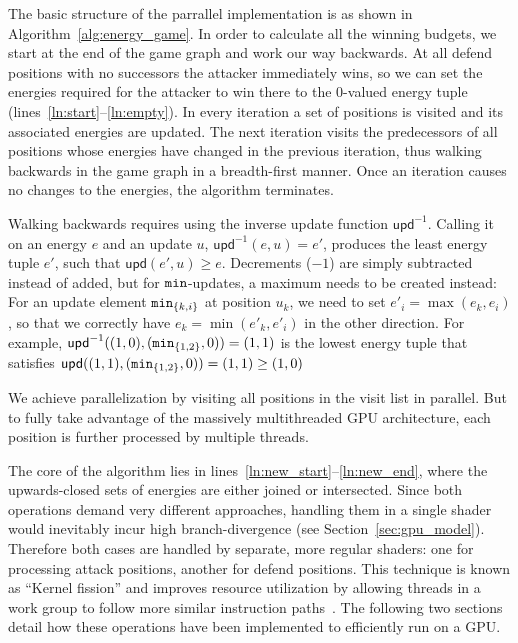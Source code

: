 The basic structure of the parrallel implementation
is as shown in Algorithm~\ref{alg:energy_game}.
In order to calculate all the winning budgets,
we start at the end of the game graph and work our way backwards.
At all defend positions with no successors the attacker immediately wins,
so we can set the energies required for the attacker to win there to the
0-valued energy tuple (lines~\ref{ln:start}--\ref{ln:empty}).
In every iteration a set of positions is visited
and its associated energies are updated.
The next iteration visits the predecessors of all positions whose energies
have changed in the previous iteration,
thus walking backwards in the game graph in a breadth-first manner.
Once an iteration causes no changes to the energies, the algorithm terminates.

Walking backwards requires using the inverse update function
$\mathsf{upd}^{-1}$.
Calling it on an energy $e$ and an update $u$, $\mathsf{upd}^{-1}(e, u) = e'$,
produces the least energy tuple $e'$, such that $\mathsf{upd}(e', u) \geq e$.
Decrements ($-1$) are simply subtracted instead of added,
but for $\mathtt{min}$-updates, a maximum needs to be created instead:
For an update element $\mathtt{min}_{\{k, i\}}$ at position $u_k$,
we need to set $e'_i = \max(e_k, e_i)$,
so that we correctly have $e_k = \min(e'_k, e'_i)$ in the other direction.
For example,
$\mathsf{upd}^{-1}((1, 0), (\mathtt{min}_{\{1, 2\}}, 0)) = (1, 1)$
is the lowest energy tuple that satisfies
$\mathsf{upd}((1, 1), (\mathtt{min}_{\{1, 2\}}, 0)) = (1, 1)
    \geq (1, 0)$

We achieve parallelization by visiting all positions in the visit list
in parallel.
But to fully take advantage of the massively multithreaded
GPU architecture, each position is further processed by multiple threads.

The core of the algorithm lies in lines~\ref{ln:new_start}--\ref{ln:new_end},
where the upwards-closed sets of energies are either joined or intersected.
Since both operations demand very different approaches,
handling them in a single shader would inevitably incur high branch-divergence
(see Section~\ref{sec:gpu_model}).
Therefore both cases are handled by separate, more regular shaders:
one for processing attack positions, another for defend positions.
This technique is known as \enquote{Kernel fission}
and improves resource utilization by allowing threads in a work group to follow
more similar instruction paths~\cite{Hijma2023}.
The following two sections detail how these operations have been implemented to
efficiently run on a GPU\@.


